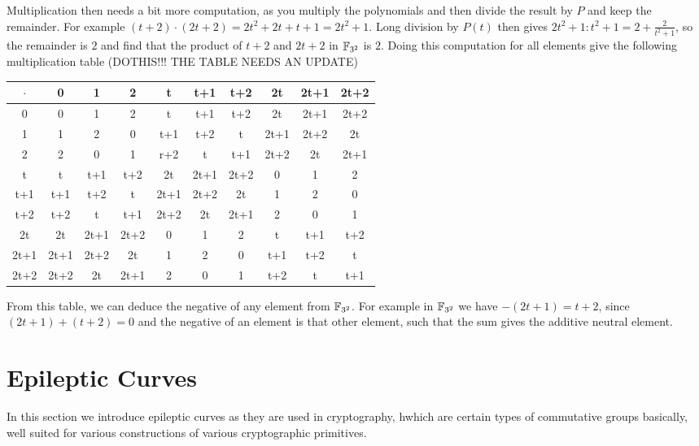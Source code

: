 \begin{example}
Multiplication then needs a bit more computation, as you multiply the polynomials and then divide the result by $P$ and keep the remainder. For example 
$(t+2) \cdot (2t+2)= 2t^2 + 2t + t + 1 = 2t^2+1$. Long division by $P(t)$ then gives $2t^2+1:t^2+1= 2 + \frac{2}{t^2+1}$, so the remainder is $2$ and find that the product of $t+2$ and $2t+2$ in $\mathbb{F}_{3^2}$ is $2$. Doing this computation for all elements give the following multiplication table (DOTHIS!!! THE TABLE NEEDS AN UPDATE)
\begin{center}
  \begin{tabular}{c | c c c c c c c c c}
$\cdot$ & 0    & 1    & 2    & t    & t+1  & t+2  & 2t   & 2t+1 & 2t+2 \\\hline
      0 & 0    & 1    & 2    & t    & t+1  & t+2  & 2t   & 2t+1 & 2t+2 \\
      1 & 1    & 2    & 0    & t+1  & t+2  & t    & 2t+1 & 2t+2 & 2t   \\
      2 & 2    & 0    & 1    & r+2  & t    & t+1  & 2t+2 & 2t   & 2t+1 \\
      t & t    & t+1  & t+2  & 2t   & 2t+1 & 2t+2 & 0    & 1    & 2    \\
    t+1 & t+1  & t+2  & t    & 2t+1 & 2t+2 & 2t   & 1    & 2    & 0    \\
    t+2 & t+2  & t    & t+1  & 2t+2 & 2t   & 2t+1 & 2    & 0    & 1    \\
     2t & 2t   & 2t+1 & 2t+2 & 0    & 1    & 2    & t    & t+1  & t+2  \\
   2t+1 & 2t+1 & 2t+2 & 2t   & 1    & 2    & 0    & t+1  & t+2  & t    \\
   2t+2 & 2t+2 & 2t   & 2t+1 & 2    & 0    & 1    & t+2  & t    & t+1
  \end{tabular}
\end{center}
From this table, we can deduce the negative of any element from $\mathbb{F}_{3^2}$. For example in $\mathbb{F}_{3^2}$ we have $-(2t+1)= t+2$, since $(2t+1) + (t+2)=0$ and the negative of an element is that other element, such that the sum gives the additive neutral element.
\end{example}

\section{Epileptic Curves}
In this section we introduce epileptic curves as they are used in cryptography, hwhich are certain types of commutative groups basically, well suited for various constructions of various cryptographic primitives. 

